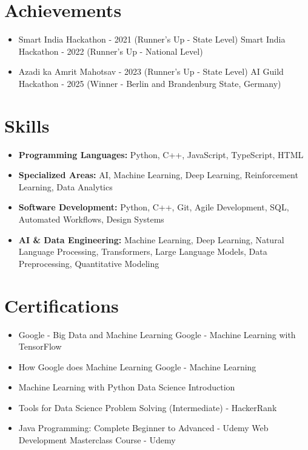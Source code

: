 \documentclass[a4paper,10pt]{article}
\begin{document}
\section*{Achievements}
\begin{itemize}
\item Smart India Hackathon - 2021 (Runner's Up - State Level) \hfill Smart India Hackathon - 2022 (Runner's Up - National Level)
\item Azadi ka Amrit Mahotsav - 2023 (Runner's Up - State Level) \hfill AI Guild Hackathon - 2025 (Winner - Berlin and Brandenburg State, Germany)
\end{itemize}

\section*{Skills}
\begin{itemize}
  \item \textbf{Programming Languages:} Python, C++, JavaScript, TypeScript, HTML
  \item \textbf{Specialized Areas:} AI, Machine Learning, Deep Learning, Reinforcement Learning, Data Analytics
  \item \textbf{Software Development:} Python, C++, Git, Agile Development, SQL, Automated Workflows, Design Systems
  \item \textbf{AI \& Data Engineering:} Machine Learning, Deep Learning, Natural Language Processing, Transformers, Large Language Models, Data Preprocessing, Quantitative Modeling
\end{itemize}

\section*{Certifications}
\begin{itemize}
\item Google - Big Data and Machine Learning \hfill Google - Machine Learning with TensorFlow
\item How Google does Machine Learning \hfill Google - Machine Learning
\item Machine Learning with Python \hfill Data Science Introduction
\item Tools for Data Science \hfill Problem Solving (Intermediate) - HackerRank
\item Java Programming: Complete Beginner to Advanced - Udemy \hfill Web Development Masterclass Course - Udemy
\end{itemize}
\end{document}
